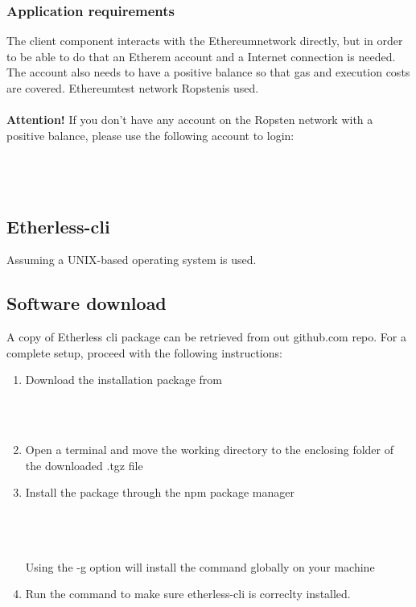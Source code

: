 \subsubsection{Application requirements}
The client component interacts with the Ethereum\glo network directly, but in order to be able to do that an Etherem account and a Internet connection is needed. The account also needs to have a positive balance so that gas and execution costs are covered. Ethereum\glo test network Ropsten\glo is used.\\\\
\textbf{Attention!} If you don't have any account on the Ropsten network with a positive balance, please use the following account to login:\\\\
	\\
	\\
\subsection{Etherless-cli}
Assuming a UNIX-based operating system is used.
\subsection{Software download}
A copy of Etherless cli package can be retrieved from out github.com repo. For a complete setup, proceed with the following instructions:
\begin{enumerate}
	\item Download the installation package from \\\\\centerline{}\\
	\item Open a terminal and move the working directory to the enclosing folder of the downloaded .tgz file\\
	\item Install the package through the npm package manager \\\\\centerline{}\\\\Using the -g option will install the command  globally on your machine
	\item Run the command  to make sure etherless-cli is correclty installed.
\end{enumerate}

